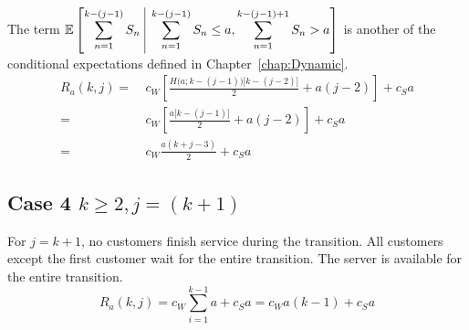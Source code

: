 The term $\displaystyle \mathbb{E} \left[ \sum_{n = 1}^{k - (j - 1)} S_{n} \ \vline \ \sum_{n = 1}^{k - (j - 1)} S_{n} \leq a, \sum_{n = 1}^{k - (j - 1) + 1} S_{n} > a \right]$ is another of the conditional expectations defined in Chapter~\ref{chap:Dynamic}.
\begin{equation}
	\begin{split}
		R_{a} (k, j)
		= & \ c_{W} \left[ \frac{H \big( a; k - (j - 1) \big) \big[ k - (j - 2) \big]}{2} + a (j - 2) \right] + c_{S} a \\
		= & \ c_{W} \left[ \frac{a \big[ k - (j - 1) \big]}{2} + a (j - 2) \right] + c_{S} a \\
		= & \ c_{W} \frac{a (k + j - 3)}{2} + c_{S} a
	\end{split}
\end{equation}

\subsection{Case 4 $k \geq 2, j = (k + 1)$}
For $j = k + 1$, no customers finish service during the transition. All customers except the first customer wait for the entire transition. The server is available for the entire transition.
\begin{equation}
	R_{a} (k, j) = c_{W} \sum_{i = 1}^{k - 1} a + c_{S} a = c_{W} a (k - 1) + c_{S} a
\end{equation}

